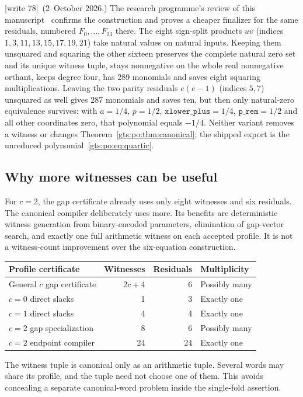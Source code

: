 \documentclass[11pt,letterpaper]{article}
\theoremstyle{definition}
\theoremstyle{remark}
\newcommand{\wtagb}{\textup{[write 78]}}
\begin{document}
\wtagb\ (2~October 2026.) The research programme's review of this manuscript~\cite{repo-rev808} confirms the construction and proves a cheaper finalizer for the same residuals, numbered $F_0,\ldots,F_{23}$ there. The eight sign-split products $uv$ (indices $1,3,11,13,15,17,19,21$) take natural values on natural inputs. Keeping them unsquared and squaring the other sixteen preserves the complete natural zero set and its unique witness tuple, stays nonnegative on the whole real nonnegative orthant, keeps degree four, has 289 monomials and saves eight squaring multiplications. Leaving the two parity residuals $e(e-1)$ (indices $5,7$) unsquared as well gives 287 monomials and saves ten, but then only natural-zero equivalence survives: with $a=1/4$, $p=1/2$, $\texttt{xlower\_plus}=1/4$, $\texttt{p\_rem}=1/2$ and all other coordinates zero, that polynomial equals $-1/4$. Neither variant removes a witness or changes Theorem~\ref{gts:po:thm:canonical}; the shipped export  is the unreduced polynomial~\eqref{gts:po:eq:quartic}.

\subsection{Why more witnesses can be useful}
For $c=2$, the gap certificate already uses only eight witnesses and six residuals. The canonical compiler deliberately uses more. Its benefits are deterministic witness generation from binary-encoded parameters, elimination of gap-vector search, and exactly one full arithmetic witness on each accepted profile. It is not a witness-count improvement over the six-equation construction.

\begin{center}
\small
\begin{tabular}{lrrl}
\toprule
Profile certificate & Witnesses & Residuals & Multiplicity\\
\midrule
General $c$ gap certificate & $2c+4$ &6&Possibly many\\
$c=0$ direct slacks &1&3&Exactly one\\
$c=1$ direct slacks &4&4&Exactly one\\
$c=2$ gap specialization &8&6&Possibly many\\
$c=2$ endpoint compiler &24&24&Exactly one\\
\bottomrule
\end{tabular}
\end{center}

The witness tuple is canonical only as an arithmetic tuple. Several words may share its profile, and the tuple need not choose one of them. This avoids concealing a separate canonical-word problem inside the single-fold assertion.
\end{document}
